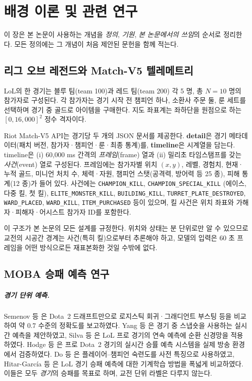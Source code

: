 \chapter{배경 이론 및 관련 연구}
\label{ch:background}

이 장은 본 논문이 사용하는 개념을 \emph{정의}, \emph{기원}, \emph{본 논문에서의 쓰임}의 순서로 정리한다. 모든 정의에는 그 개념이 처음 제안된 문헌을 함께 적는다.

\section{리그 오브 레전드와 Match-V5 텔레메트리}
\label{sec:bg-telemetry}

LoL의 한 경기는 블루 팀(team 100)과 레드 팀(team 200) 각 5 명, 총 $N=10$ 명의 참가자로 구성된다. 각 참가자는 경기 시작 전 챔피언 하나, 소환사 주문 둘, 룬 세트를 선택하며 경기 중 골드로 아이템을 구매한다. 지도 좌표계는 좌하단을 원점으로 하는 $[0, 16{,}000]^2$ 정수 격자이다.

Riot Match-V5 API는 경기당 두 개의 JSON 문서를 제공한다. \textbf{detail}은 경기 메타데이터(패치 버전, 참가자·챔피언·룬·최종 통계)를, \textbf{timeline}은 시계열을 담는다. timeline은 (i) 60{,}000 ms 간격의 \emph{프레임}(frame) 열과 (ii) 밀리초 타임스탬프를 갖는 \emph{사건}(event) 열로 구성된다. 프레임에는 참가자별 위치 $(x, y)$, 레벨, 경험치, 현재·누적 골드, 미니언 처치 수, 체력·자원, 챔피언 스탯(공격력, 방어력 등 25 종), 피해 통계(12 종)가 들어 있다. 사건에는 \texttt{CHAMPION\_KILL}, \texttt{CHAMPION\_SPECIAL\_KILL} (에이스, 다중 킬, 첫 킬), \texttt{ELITE\_MONSTER\_KILL}, \texttt{BUILDING\_KILL}, \texttt{TURRET\_PLATE\_DESTROYED}, \texttt{WARD\_PLACED}, \texttt{WARD\_KILL}, \texttt{ITEM\_PURCHASED} 등이 있으며, 킬 사건은 위치 좌표와 가해자·피해자·어시스트 참가자 ID를 포함한다.

이 구조가 본 논문의 모든 설계를 규정한다. 위치와 상태는 분 단위로만 알 수 있으므로 교전의 시공간 경계는 사건(특히 킬)으로부터 추론해야 하고, 모델의 입력은 60 초 프레임을 어떤 방식으로든 재표본화한 것일 수밖에 없다.

\section{MOBA 승패 예측 연구}
\label{sec:bg-related}

\paragraph{경기 단위 예측.} Semenov 등 \cite{semenov2016performance}은 Dota~2 드래프트만으로 로지스틱 회귀·그래디언트 부스팅 등을 비교하여 약 $0.7$ 수준의 정확도를 보고하였다. Yang 등 \cite{yang2016realtime}은 경기 중 스냅숏을 사용하는 실시간 예측을 제안하였고, Silva 등 \cite{silva2018continuous}은 LoL 프로 경기의 연속 예측에 순환 신경망을 적용하였다. Hodge 등 \cite{hodge2021win}은 프로 Dota~2 경기의 실시간 승률 예측 시스템을 실제 방송 환경에서 검증하였다. Do 등 \cite{do2021using}은 플레이어--챔피언 숙련도를 사전 특징으로 사용하였고, Hitar-García 등 \cite{hitar2023machine}은 LoL 경기 승패 예측에 대한 기계학습 방법을 폭넓게 비교하였다. 이들은 모두 \emph{경기}의 승패를 목표로 하며, 교전 단위 라벨은 다루지 않는다.

